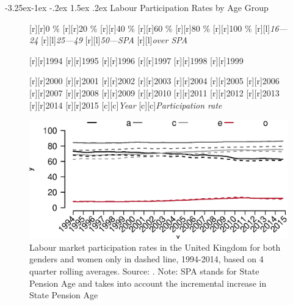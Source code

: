 \documentclass[11 pt, a4paper]{report}
\makeatletter
\renewcommand\subsection{\@startsection{subsection}{2}{\z@}%
                                     {-3.25ex\@plus -1ex \@minus -.2ex}%
                                     {1.5ex \@plus .2ex}%
    								{\large\scshape}}
\makeatother
\begin{document}
\subsection{Labour Participation Rates by Age Group}


\begin{figure}[hbtp!]
[r][r]{\small{0 \%}}
[r][r]{\small{20 \%}}
[r][r]{\small{40 \%}}
[r][r]{\small{60 \%}}
[r][r]{\small{80 \%}}
[r][r]{\small{100 \%}}
[r][l]{\small{\emph{16---24}}}
[r][l]{\small{\emph{25---49}}}
[r][l]{\small{\emph{50---SPA}}}
[r][l]{\small{\emph{over SPA}}}

[r][r]{\small{1994}}
[r][r]{\small{1995}}
[r][r]{\small{1996}}
[r][r]{\small{1997}}
[r][r]{\small{1998}}
[r][r]{\small{1999}}

[r][r]{\small{2000}}
[r][r]{\small{2001}}
[r][r]{\small{2002}}
[r][r]{\small{2003}}
[r][r]{\small{2004}}
[r][r]{\small{2005}}
[r][r]{\small{2006}}
[r][r]{\small{2007}}
[r][r]{\small{2008}}
[r][r]{\small{2009}}
[r][r]{\small{2010}}
[r][r]{\small{2011}}
[r][r]{\small{2012}}
[r][r]{\small{2013}}
[r][r]{\small{2014}}
[r][r]{\small{2015}}
[c][c]{\small{\emph{Year}}}
[c][c]{\small{\emph{Participation rate}}}


\includegraphics[width=\textwidth]{../figures/Fig5.4.eps}
\caption{Labour market participation rates in the United Kingdom for both genders and women only in dashed line, 1994-2014, based on 4 quarter rolling averages. Source: \citet{ONS2015a}.  Note: SPA stands for State Pension Age and takes into account the incremental increase in State Pension Age}
\label{Fig:58}
\end{figure}
\end{document}

